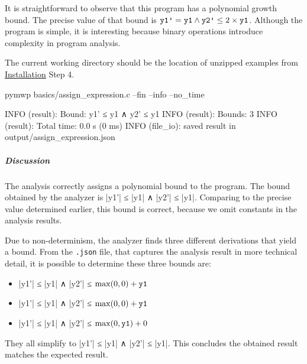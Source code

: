 It is straightforward to observe that this program has a polynomial growth bound.
The precise value of that bound is \(\prm{y1'} = \prm{y1} \land \prm{y2'} \leq 2 \times \prm{y1}\).
Although the program is simple, it is interesting because binary operations introduce complexity in program analysis.

The current working directory should be the location of unzipped examples from \hyperref[guide-install]{Installation} Step 4.

\begin{center}
\begin{minipage}{\textwidth}
\begin{cmdlisting}[label={lst:ex1-run}]
pymwp basics/assign_expression.c --fin --info --no_time
\end{cmdlisting}
\end{minipage}
\end{center}

\begin{center}
\begin{minipage}{\textwidth}
\begin{outlisting}[label={lst:ex-output}]
INFO (result): Bound: y1' ≤ y1 ∧ y2' ≤ y1
INFO (result): Bounds: 3
INFO (result): Total time: 0.0 s (0 ms)
INFO (file_io): saved result in output/assign_expression.json
\end{outlisting}
\end{minipage}
\end{center}

\subparagraph*{Discussion}
The analysis correctly assigns a polynomial bound to the program.
The bound obtained by the analyzer is \pr|y1'| ≤ \pr|y1| ∧ \pr|y2'| ≤ \pr|y1|.
Comparing to the precise value determined earlier, this bound is correct, because we omit constants in the analysis results.

Due to non-determinism, the analyzer finds three different derivations that yield a bound.
From the \texttt{.json} file, that captures the analysis result in more technical detail, it is possible to determine these three bounds are:
\begin{itemize}
\item \pr|y1'| ≤ \pr|y1| ∧ \pr|y2'| ≤ \(\max(0,0) + \prm{y1}\)
\item \pr|y1'| ≤ \pr|y1| ∧ \pr|y2'| ≤ \(\max(0,0) + \prm{y1}\)
\item \pr|y1'| ≤ \pr|y1| ∧ \pr|y2'| ≤ \(\max(0,\prm{y1}) + 0\)
\end{itemize}
They all simplify to \pr|y1'| ≤ \pr|y1| ∧ \pr|y2'| ≤ \pr|y1|.
This concludes the obtained result matches the expected result.

